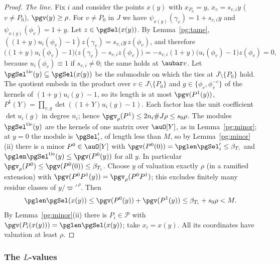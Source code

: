 \documentclass[10pt]{amsart}
\theoremstyle{definition}
\theoremstyle{remark}
\begin{document}
\begin{proof}
\emph{The line.} Fix $i$ and consider the points $x(y)$ with $x_{P_0}=y$, $x_v=s_{v,i}y$
($v\ne P_0$), $\pgv(y)\ge\rho$. For $v\ne P_0$ in $J$ we have $\psi_{x(y)}(\gamma_v)=1+s_{v,i}y$
and $\psi_{x(y)}(\phi_v)=1+y$. Let $z\in\pgSel(x(y))$. By Lemma~\ref{pg:tame},
$((1+y)u_i(\phi_v)-1)z(\gamma_v)=s_{v,i}y\,z(\phi_v)$, and therefore
\[
\bigl((1+y)u_i(\phi_v)-1\bigr)\bigl(z(\gamma_v)-s_{v,i}z(\phi_v)\bigr)=-s_{v,i}(1+y)\bigl(u_i(
\phi_v)-1\bigr)z(\phi_v)=0,
\]
because $u_i(\phi_v)\equiv1$ if $s_{v,i}\ne0$; the same holds at $\aubar v$. Let
$\pgSel^{\mathrm{tie}}(y)\subseteq\pgSel(x(y))$ be the submodule on which the ties at
$J\setminus\{P_0\}$ hold. The quotient embeds in the product over $v\in J\setminus\{P_0\}$ and
$g\in\{\phi_v,\phi_v^{-c}\}$ of the kernels of $(1+y)u_i(g)-1$, so its length is at most
$\pgv(P^1(y))$, $P^1(Y)=\prod_{v,g}\det((1+Y)u_i(g)-1)$. Each factor has the unit coefficient
$\det u_i(g)$ in degree $n_i$; hence $\pgv_\rho(P^1)\le2n_i\#J\rho\le s_0\rho$. The modules
$\pgSel^{\mathrm{tie}}(y)$ are the kernels of one matrix over $\auO[Y]$, as in
Lemma~\ref{pg:minor}; at $y=0$ the module is $\pgSel'_i$, of length less than $M$, so by
Lemma~\ref{pg:minor}(ii) there is a minor $P^0\in\auO[Y]$ with $\pgv(P^0(0))=\pglen\pgSel'_i\le
\beta_{T_i}$ and $\pglen\pgSel^{\mathrm{tie}}(y)\le\pgv(P^0(y))$ for all $y$. In particular
$\pgv_\rho(P^0)\le\pgv(P^0(0))\le\beta_{T_i}$. Choose $y$ of valuation exactly $\rho$ (in a
ramified extension) with $\pgv(P^0P^1(y))=\pgv_\rho(P^0P^1)$; this excludes finitely many residue
classes of $y/\varpi'^{\,\rho}$. Then
\[
\pglen\pgSel(x(y))\le\pgv(P^0(y))+\pgv(P^1(y))\le\beta_{T_i}+s_0\rho<M .
\]
By Lemma~\ref{pg:minor}(ii) there is $P_i\in\mathcal P$ with $\pgv(P_i(x(y)))=\pglen\pgSel(x(y))$;
take $x_i=x(y)$. All its coordinates have valuation at least $\rho$.
\end{proof}

\subsubsection*{The $L$-values}
\end{document}
